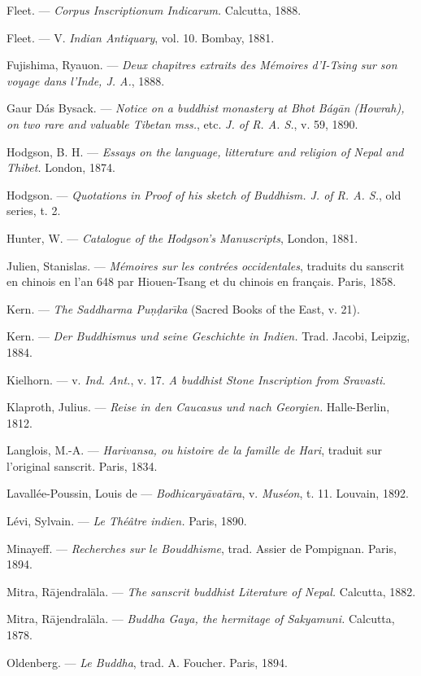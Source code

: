 \documentclass[a4paper, 11pt, oneside, french, landscape, twocolumn]{article}
\begin{document}
Fleet. --- \emph{Corpus Inscriptionum Indicarum.} Calcutta, 1888.

Fleet. --- V. \emph{Indian Antiquary}, vol. 10. Bombay, 1881.

Fujishima, Ryauon. --- \emph{Deux chapitres extraits des Mémoires d'I-Tsing sur son voyage dans l'Inde, J. A.}, 1888.

Gaur Dás Bysack. --- \emph{Notice on a buddhist monastery at Bhot Bág\={a}n (Howrah), on two rare and valuable Tibetan mss.}, etc. \emph{J. of R. A. S.}, v. 59, 1890.

Hodgson, B. H. --- \emph{Essays on the language, litterature and religion of Nepal and Thibet.} London, 1874.

Hodgson. --- \emph{Quotations in Proof of his sketch of Buddhism. J. of R. A. S.}, old series, t. 2.

Hunter, W. --- \emph{Catalogue of the Hodgson's Manuscripts}, London, 1881.

Julien, Stanislas. --- \emph{Mémoires sur les contrées occidentales}, traduits du sanscrit en chinois en l'an 648 par Hiouen-Tsang et du chinois en français. Paris, 1858.

Kern. --- \emph{The Saddharma Pu\d{n}\d{d}ar\={\i}ka} (Sacred Books of the East, v. 21).

Kern. --- \emph{Der Buddhismus und seine Geschichte in Indien.} Trad. Jacobi, Leipzig, 1884.

Kielhorn. --- v. \emph{Ind. Ant.}, v. 17. \emph{A buddhist Stone Inscription from Sravasti.}

Klaproth, Julius. --- \emph{Reise in den Caucasus und nach Georgien.} Halle-Berlin, 1812.

Langlois, M.-A. --- \emph{Harivansa, ou histoire de la famille de Hari}, traduit sur l'original sanscrit. Paris, 1834.

Lavallée-Poussin, Louis de --- \emph{Bodhicary\={a}vat\={a}ra}, v. \emph{Muséon}, t. 11. Louvain, 1892.

Lévi, Sylvain. --- \emph{Le Théâtre indien.} Paris, 1890.

Minayeff. --- \emph{Recherches sur le Bouddhisme}, trad. Assier de Pompignan. Paris, 1894.

Mitra, R\={a}jendral\={a}la. --- \emph{The sanscrit buddhist Literature of Nepal.} Calcutta, 1882.

Mitra, R\={a}jendral\={a}la. --- \emph{Buddha Gaya, the hermitage of Sakyamuni.} Calcutta, 1878.

Oldenberg. --- \emph{Le Buddha}, trad. A. Foucher. Paris, 1894.
\end{document}
